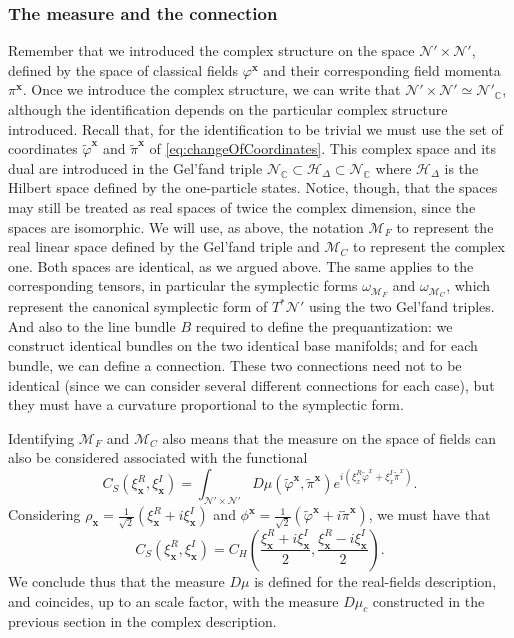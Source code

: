 \documentclass[12pt]{article}%
\begin{document}
\subsubsection{The measure and the connection}
Remember that we introduced the complex structure on the space $\mathcal{N}'\times \mathcal{N}'$, defined by the space of classical fields $ \varphi^\mathbf{x}$ and their corresponding field momenta $\pi^\mathbf{x}$. Once we introduce the complex structure, we can write that $\mathcal{N}'\times \mathcal{N}'\simeq \mathcal{N}'_\mathbb{C}$, although the identification depends on the particular complex structure introduced. Recall that, for the identification to be trivial we must use the set of coordinates $\tilde \varphi^\mathbf{x}$ and $\tilde \pi^\mathbf{x}$ of \eqref{eq:changeOfCoordinates}.  This complex space and its dual are introduced in the Gel'fand triple $\mathcal{N}_\mathbb{C}\subset \mathcal{H}_\Delta\subset \mathcal{N}_\mathbb{C}$ where $\mathcal{H}_\Delta$ is the Hilbert space defined by the one-particle states. Notice, though, that the spaces may still be treated as real spaces of twice the complex dimension, since the spaces are isomorphic. We will use, as above, the notation $\mathcal{M}_F$ to represent the real linear space defined by the Gel'fand triple and  $\mathcal{M}_C$ to represent the complex one. Both spaces are identical, as we argued above. The same applies to the corresponding tensors, in particular the symplectic forms $\omega_{\mathcal{M}_F}$ and $\omega_{\mathcal{M}_C}$, which represent the canonical symplectic form of $T^*\mathcal{N}'$ using the two  Gel'fand triples. And also to the line bundle $B$ required to define the prequantization: we construct identical bundles on the two identical base manifolds; and for each bundle, we can define a connection. These two connections need not to be identical (since we can consider several different connections for each case), but they must have a curvature proportional to the symplectic form. 

Identifying $\mathcal{M}_F$ and $\mathcal{M}_C$ also means that the measure on the space of fields can also be considered associated with the functional 
\begin{equation}
\label{eq:C_real}
C_S(\xi^{R}_\mathbf{x},\xi^I_\mathbf{x})=\int_{\mathcal{N}'\times \mathcal{N}'} D\mu(\tilde \varphi^\mathbf{x}, \tilde \pi^\mathbf{x}) e^{{i}\left(\xi_x^R\tilde \varphi^x+ \xi^I_x\tilde\pi^x\right)}.
\end{equation}
Considering $\rho_{\mathbf{x}}=\frac1{\sqrt{2}}(\xi^R_\mathbf{x}+i\xi^I_\mathbf{x})$ and $\phi^\mathbf{x}=\frac{1}{\sqrt2}(\tilde\varphi^{\mathbf{x}}+i \tilde\pi^{\mathbf{x}} )$, we must have that
\begin{equation}
\label{eq:C_equiv}
C_S(\xi^{R}_\mathbf{x},\xi^I_\mathbf{x})=C_H\left(\frac{\xi^{R}_\mathbf{x}+i\xi^{I}_\mathbf{x}}{2}, \frac{\xi^{R}_\mathbf{x}-i\xi^{I}_\mathbf{x}}{2}\right).
\end{equation}
 We conclude thus that the measure $D\mu$ is defined for the real-fields description, and coincides, up to an scale factor,  with the measure $D\mu_c$ constructed in the previous section in the complex description.
\end{document}
